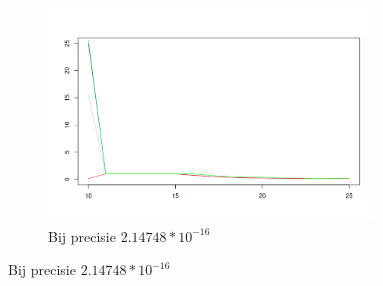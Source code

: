 \documentclass{article}
\begin{document}
\begin{figure}[!htb]
\begin{subfigure}{0.49\textwidth}
 \end{subfigure}
 \begin{subfigure}{0.49\textwidth}
  \caption{Bij precisie $2.14748*10^{-16}$}
  \includegraphics[width=0.95\textwidth]{elegant-gl/datasets/plot_it_2.14748e-16prec}
 \end{subfigure}
\end{figure}
\end{document}
